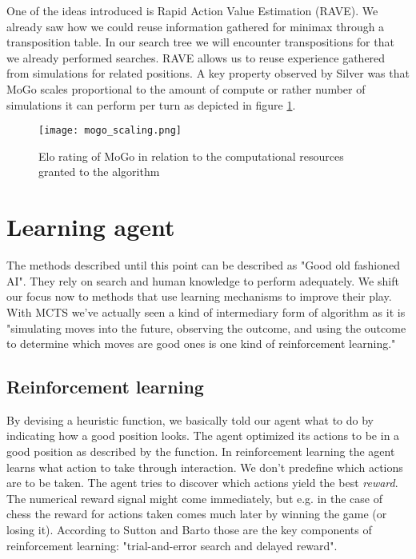 One of the ideas introduced is Rapid Action Value Estimation (RAVE). We already saw how we could reuse information gathered for minimax through a transposition table. In our search tree we will encounter transpositions for that we already performed searches. RAVE allows us to reuse experience gathered from simulations for related positions. A key property observed by Silver was that MoGo scales proportional to the amount of compute or rather number of simulations it can perform per turn as depicted in figure \ref{mogo_scaling}.

\begin{figure}
    \centering
    \texttt{[image: mogo\_scaling.png]}
    \caption{Elo rating of MoGo in relation to the computational resources granted to the algorithm \cite{gelly_monte-carlo_2011}}
    \label{mogo_scaling}
\end{figure}

\section{Learning agent}
The methods described until this point can be described as "Good old fashioned AI". They rely on search and human knowledge to perform adequately. We shift our focus now to methods that use learning mechanisms to improve their play. With MCTS we've actually seen a kind of intermediary form of algorithm as it is "simulating moves into the future, observing the outcome, and using the outcome to determine which moves are good ones is one kind of reinforcement learning." \cite[p. 331]{russell_artificial_2021}

\subsection{Reinforcement learning}
By devising a heuristic function, we basically told our agent what to do by indicating how a good position looks. The agent optimized its actions to be in a good position as described by the function. In reinforcement learning the agent learns what action to take through interaction. We don't predefine which actions are to be taken. The agent tries to discover which actions yield the best \textit{reward}. The numerical reward signal might come immediately, but e.g. in the case of chess the reward for actions taken comes much later by winning the game (or losing it). According to Sutton and Barto those are the key components of reinforcement learning: "trial-and-error search and delayed reward". \cite[p. 1]{sutton_reinforcement_2018}

